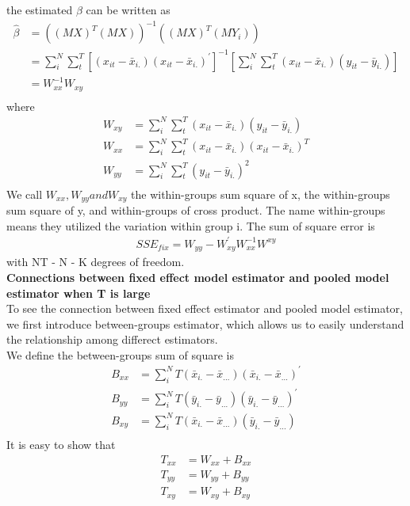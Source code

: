 \documentclass[a4paper]{article}
\begin{document}
the estimated $\beta$ can be written as
\begin{align*}
\hat \beta & = ((MX)^T(MX))^{-1}((MX)^T(MY_i)) \\
               & =\sum_i^N\sum_t^T[(x_{it}-\bar x_{i.})(x_{it}- \bar x_{i.})^{'}]^{-1}[\sum_i^N\sum_t^T(x_{it}-\bar x_{i.})(y_{it}- \bar y_{i.})] \\
               & = W_{xx}^{-1}W_{xy}\\
\end{align*}
where 
\begin{align*}
W_{xy} &= \sum_i^N\sum_t^T(x_{it}-\bar x_{i.})(y_{it}- \bar y_{i.}) \\
W_{xx} &= \sum_i^N\sum_t^T(x_{it}-\bar x_{i.})(x_{it}- \bar x_{i.})^T\\
W_{yy} &= \sum_i^N\sum_t^T(y_{it}-\bar y_{i.})^2\\
\end{align*}
We call $W_{xx}, W_{yy} and W_{xy}$ the within-groups sum square of x, the within-groups sum square of y, and within-groups of cross product. The name within-groups means they utilized the variation within group i. The sum of square error is
\begin{align*}
SSE_{fix} = W_{yy} - W^{'}_{xy}W^{-1}_{xx}W^{xy}
\end{align*}
with NT - N - K degrees of freedom.\\
{\bf Connections between fixed effect model estimator and pooled model estimator when T is large}\\
To see the connection between fixed effect estimator and pooled model estimator, we first introduce between-groups estimator, which allows us to easily understand the relationship among differect estimators.\\
We define the between-groups sum of square is
\begin{align*}
B_{xx} & = \sum_i^NT(\bar x_{i.}-\bar x_{...})(\bar x_{i.}-\bar x_{...})^{'} \\
B_{yy} &= \sum_i^NT(\bar y_{i.}-\bar y_{...})(\bar y_{i.}-\bar y_{...})^{'}\\
B_{xy} &= \sum_i^NT(\bar x_{i.}-\bar x_{...})(\bar y_{i.}-\bar y_{...})\\
\end{align*}
It is easy to show that 
\begin{align*}
T_{xx} &= W_{xx} + B_{xx} \\
T_{yy} &= W_{yy} + B_{yy} \\
T_{xy} &= W_{xy} + B_{xy} \\
\end{align*}
\end{document}
